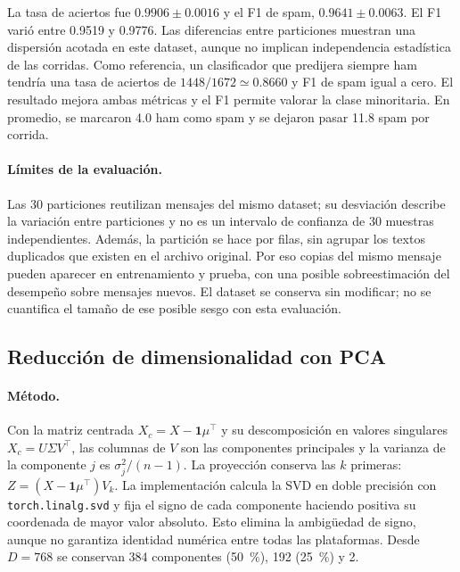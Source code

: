 La tasa de aciertos fue $0.9906\pm0.0016$ y el F1 de spam,
$0.9641\pm0.0063$. El F1 varió entre 0.9519 y 0.9776. Las diferencias
entre particiones muestran una dispersión acotada en este dataset, aunque
no implican independencia estadística de las corridas. Como referencia, un
clasificador que predijera siempre ham tendría una tasa de aciertos de
$1448/1672\simeq0.8660$ y F1 de spam igual a cero. El resultado mejora
ambas métricas y el F1 permite valorar la clase minoritaria. En promedio,
se marcaron 4.0 ham como spam y se dejaron pasar
11.8 spam por corrida.

\paragraph{Límites de la evaluación.} Las 30 particiones reutilizan mensajes
del mismo dataset; su desviación describe la variación entre particiones y
no es un intervalo de confianza de 30 muestras independientes. Además, la
partición se hace por filas, sin agrupar los textos duplicados que existen
en el archivo original. Por eso copias del mismo mensaje pueden aparecer en
entrenamiento y prueba, con una posible sobreestimación del desempeño sobre
mensajes nuevos. El dataset se conserva sin modificar; no se cuantifica el
tamaño de ese posible sesgo con esta evaluación.

\subsection{Reducción de dimensionalidad con PCA}
\label{sec:pca}

\paragraph{Método.} Con la matriz centrada
$X_c=X-\mathbf{1}\mu^\top$ y su descomposición en valores singulares
$X_c=U\Sigma V^\top$, las columnas de $V$ son las componentes principales
y la varianza de la componente $j$ es $\sigma_j^2/(n-1)$. La proyección
conserva las $k$ primeras: $Z=(X-\mathbf{1}\mu^\top)V_k$.
La implementación calcula la SVD en doble precisión con
\texttt{torch.linalg.svd} y fija el signo de cada componente haciendo
positiva su coordenada de mayor valor absoluto. Esto elimina la ambigüedad
de signo, aunque no garantiza identidad numérica entre todas las plataformas.
Desde $D=768$ se conservan 384 componentes (50~\%), 192 (25~\%) y 2.


